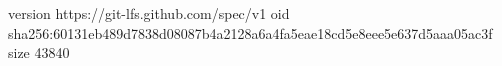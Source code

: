 version https://git-lfs.github.com/spec/v1
oid sha256:60131eb489d7838d08087b4a2128a6a4fa5eae18cd5e8eee5e637d5aaa05ac3f
size 43840
